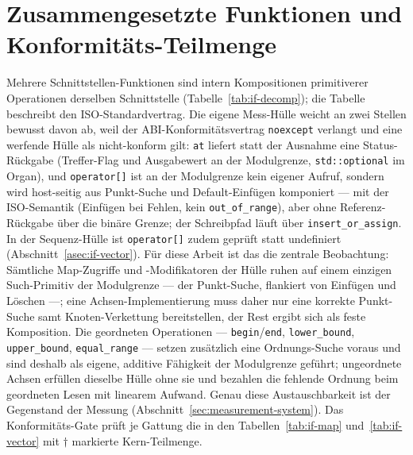 \section{Zusammengesetzte Funktionen und Konformitäts-Teilmenge}\label{asec:if-decomp}
Mehrere Schnittstellen-Funktionen sind intern Kompositionen primitiverer Operationen derselben Schnittstelle
(Tabelle~\ref{tab:if-decomp}); die Tabelle beschreibt den ISO-Standardvertrag. Die eigene Mess-Hülle
weicht an zwei Stellen bewusst davon ab, weil der ABI-Konformitätsvertrag \texttt{noexcept} verlangt
und eine werfende Hülle als nicht-konform gilt: \texttt{at} liefert statt der Ausnahme eine
Status-Rückgabe (Treffer-Flag und Ausgabewert an der Modulgrenze, \texttt{std::optional} im Organ),
und \texttt{operator[]} ist an der Modulgrenze kein eigener Aufruf, sondern wird host-seitig aus
Punkt-Suche und Default-Einfügen komponiert --- mit der ISO-Semantik (Einfügen bei Fehlen, kein
\texttt{out\_of\_range}), aber ohne Referenz-Rückgabe über die binäre Grenze; der Schreibpfad läuft über
\texttt{insert\_or\_assign}. In der Sequenz-Hülle ist \texttt{operator[]} zudem geprüft statt
undefiniert (Abschnitt~\ref{asec:if-vector}). Für diese Arbeit ist das die zentrale Beobachtung:
Sämtliche Map-Zugriffe und -Modifikatoren der Hülle ruhen auf einem einzigen Such-Primitiv der
Modulgrenze --- der Punkt-Suche, flankiert von Einfügen und Löschen ---; eine Achsen-Implementierung
muss daher nur eine korrekte Punkt-Suche samt Knoten-Verkettung bereitstellen, der Rest ergibt sich
als feste Komposition. Die geordneten Operationen --- \texttt{begin}/\texttt{end},
\texttt{lower\_bound}, \texttt{upper\_bound}, \texttt{equal\_range} --- setzen zusätzlich eine
Ordnungs-Suche voraus und sind deshalb als eigene, additive Fähigkeit der Modulgrenze geführt;
ungeordnete Achsen erfüllen dieselbe Hülle ohne sie und bezahlen die fehlende Ordnung beim
geordneten Lesen mit linearem Aufwand. Genau diese Austauschbarkeit ist der Gegenstand der Messung
(Abschnitt~\ref{sec:measurement-system}). Das Konformitäts-Gate prüft je Gattung die in den
Tabellen~\ref{tab:if-map} und~\ref{tab:if-vector} mit $\dagger$ markierte Kern-Teilmenge.

